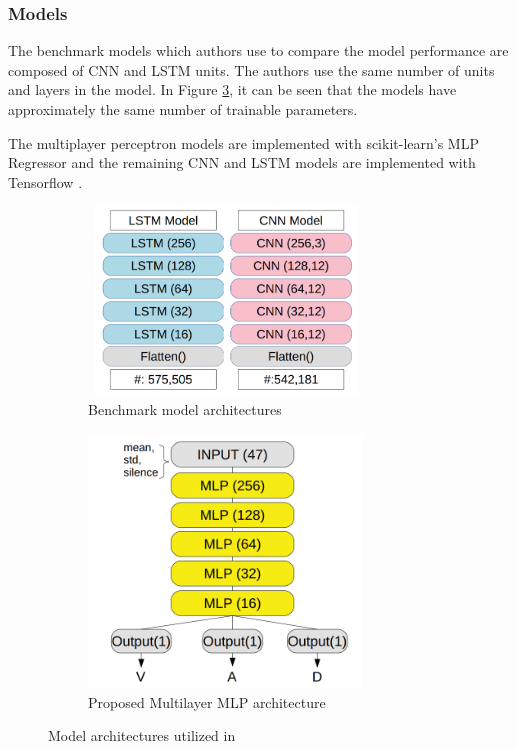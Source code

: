 \documentclass[a4paper,11pt]{article}
\begin{document}
\subsubsection{Models}

The benchmark models which authors use to compare the model performance are composed of CNN and LSTM units. The authors use the same number of units and layers in the model. In Figure \ref{fig:models}, it can be seen that the models have approximately the same number of trainable parameters. 

The multiplayer perceptron models are implemented with scikit-learn's MLP Regressor \cite{scikit-learn} and the remaining CNN and LSTM models are implemented with Tensorflow \cite{tensorflow2015-whitepaper}.

\begin{figure}[h]
\centering
\begin{subfigure}[b]{0.45\textwidth}
\centering
\includegraphics[width=0.8\textwidth, height=5cm]{modelsparams.png}
\caption{Benchmark model architectures}\label{subfig:subcnnlstm}
\end{subfigure}
\begin{subfigure}[b]{0.45\linewidth}
\centering
\includegraphics[width=0.8\textwidth]{modelparamsmlp.png}
\caption{Proposed Multilayer MLP architecture}\label{subfig:submlp}
\end{subfigure}
\caption{Model architectures utilized in \cite{atmaja2020deep}}
\label{fig:models}
\end{figure}
\end{document}
